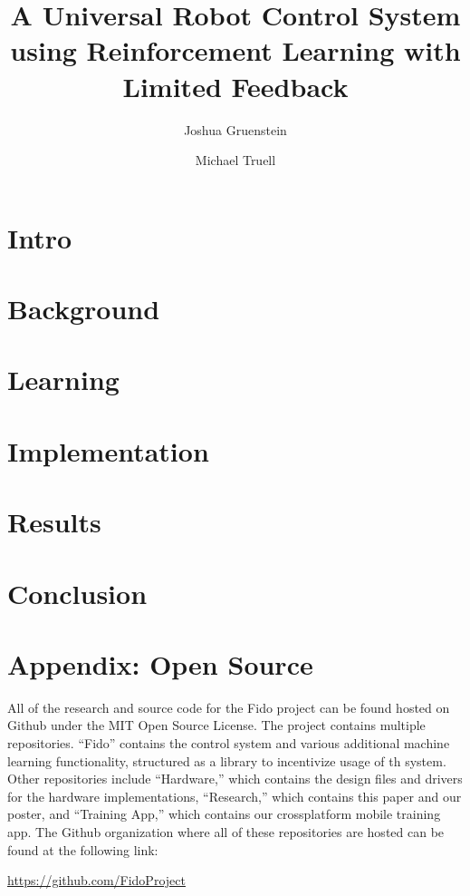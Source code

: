 \documentclass[letterpaper,11pt]{article}
\title{A Universal Robot Control System using Reinforcement Learning with Limited Feedback}
\author{Joshua Gruenstein \and Michael Truell}
\begin{document}
\maketitle



\pagebreak

\section{Intro}



\section{Background}



\section{Learning}



\section{Implementation}



\section{Results}



\section{Conclusion}



\nocite{*}

\pagebreak



\pagebreak
\section{Appendix: Open Source}

All of the research and source code for the Fido project can be found hosted on Github under the MIT Open Source License.  The project contains multiple repositories. ``Fido'' contains the control system and various additional machine learning functionality, structured as a library to incentivize usage of th system.  Other repositories include ``Hardware,'' which contains the design files and drivers for the hardware implementations, ``Research,'' which contains this paper and our poster, and ``Training App,'' which contains our crossplatform mobile training app.  The Github organization where all of these repositories are hosted can be found at the following link:

\vspace{0.5cm}
\centering
\url{https://github.com/FidoProject}
\end{document}
